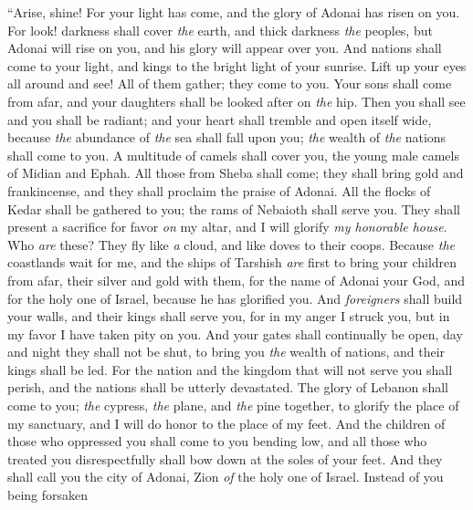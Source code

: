 \begin{biblechapter} %
 “Arise, shine! For your light has come, 
and the glory of Adonai has risen on you.
\verse For look! darkness shall cover \textit{the} earth, 
and thick darkness \textit{the} peoples, 
but Adonai will rise on you, 
and his glory will appear over you.
\verse And nations shall come to your light, 
and kings to the bright light of your sunrise.
\verse Lift up your eyes all around and see! 
All of them gather; they come to you. 
Your sons shall come from afar, 
and your daughters shall be looked after on \textit{the} hip.
\verse Then you shall see 
and you shall be radiant; 
and your heart shall tremble 
and open itself wide, 
because \textit{the} abundance of \textit{the} sea shall fall upon you; 
\textit{the} wealth of \textit{the} nations shall come to you.
\verse A multitude of camels shall cover you, 
the young male camels of Midian and Ephah. 
All those from Sheba shall come; 
they shall bring gold and frankincense, 
and they shall proclaim the praise of Adonai.
\verse All the flocks of Kedar shall be gathered to you; 
the rams of Nebaioth shall serve you. 
They shall present a sacrifice for favor \textit{on} my altar, 
and I will glorify \textit{my honorable house}.
\verse Who \textit{are} these? They fly like \textit{a} cloud, 
and like doves to their coops.
\verse Because \textit{the} coastlands wait for me, 
and the ships of Tarshish \textit{are} first 
to bring your children from afar, 
their silver and gold with them, 
for the name of Adonai your God, 
and for the holy one of Israel, because he has glorified you.
\verse And \textit{foreigners} shall build your walls, 
and their kings shall serve you, 
for in my anger I struck you, 
but in my favor I have taken pity on you.
\verse And your gates shall continually be open, 
day and night they shall not be shut, 
to bring you \textit{the} wealth of nations, 
and their kings shall be led.
\verse For the nation and the kingdom that will not serve you shall perish, 
and the nations shall be utterly devastated.
\verse The glory of Lebanon shall come to you; 
\textit{the} cypress, \textit{the} plane, and \textit{the} pine together, 
to glorify the place of my sanctuary, 
and I will do honor to the place of my feet.
\verse And the children of those who oppressed you shall come to you bending low, 
and all those who treated you disrespectfully shall bow down at the soles of your feet. 
And they shall call you the city of Adonai, 
Zion \textit{of} the holy one of Israel.
\verse Instead of you being forsaken 

\end{biblechapter}
